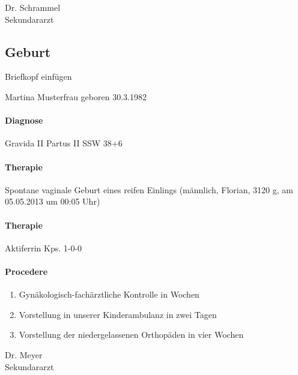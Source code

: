 Dr. Schrammel\\
Sekundararzt


\subsection{Geburt}


Briefkopf einfügen

Martina Musterfrau geboren 30.3.1982

\paragraph{Diagnose} Gravida II Partus II SSW 38+6 

\paragraph{Therapie}
Spontane vaginale Geburt eines reifen Einlings (männlich,
Florian, 3120 g, am 05.05.2013 um 00:05 Uhr)

\paragraph{Therapie} 
Aktiferrin Kps. 1-0-0

\paragraph{Procedere} 

\begin{enumerate}
  \item Gynäkologisch-fachärztliche Kontrolle
in  Wochen 
\item 
Vorstellung in unserer Kinderambulanz
in zwei Tagen 
\item 
Vorstellung der niedergelassenen Orthopäden in vier Wochen
\end{enumerate}



Dr. Meyer\\
Sekundararzt 




\ChapterEnd
